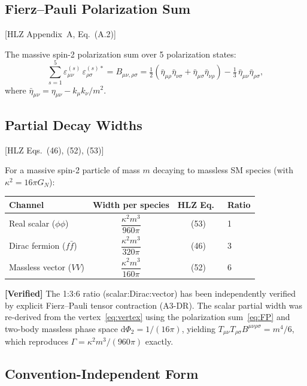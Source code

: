 \documentclass[11pt,a4paper]{article}
\theoremstyle{plain}
\theoremstyle{definition}
\theoremstyle{remark}
\newcommand{\dd}{\mathrm{d}}
\newcommand{\fromlit}[1]{\textcolor{blue!70!black}{\textsf{[#1]}}}
\newcommand{\verified}[1]{%
  \par\smallskip\noindent
  \colorbox{green!10}{\parbox{\dimexpr\linewidth-2\fboxsep}{%
    \textcolor{green!50!black}{\textbf{[Verified]}} #1}}%
  \par\smallskip}
\begin{document}
\subsection{Fierz--Pauli Polarization Sum}

\fromlit{HLZ Appendix~A, Eq.~(A.2)}

The massive spin-2 polarization sum over 5 polarization states:
\begin{equation}\label{eq:FP}
  \sum_{s=1}^{5} \varepsilon_{\mu\nu}^{(s)}\,
  \varepsilon_{\rho\sigma}^{(s)*}
  = B_{\mu\nu,\rho\sigma}
  = \tfrac{1}{2}(\bar{\eta}_{\mu\rho}\bar{\eta}_{\nu\sigma}
    + \bar{\eta}_{\mu\sigma}\bar{\eta}_{\nu\rho})
    - \tfrac{1}{3}\,\bar{\eta}_{\mu\nu}\bar{\eta}_{\rho\sigma},
\end{equation}
where $\bar{\eta}_{\mu\nu} = \eta_{\mu\nu} - k_\mu k_\nu/m^2$.

\subsection{Partial Decay Widths}

\fromlit{HLZ Eqs.~(46), (52), (53)}

For a massive spin-2 particle of mass $m$ decaying to massless SM
species (with $\kappa^2 = 16\pi G_N$):

\begin{center}
\begin{tabular}{lccl}
\toprule
Channel & Width per species & HLZ Eq.\ & Ratio \\
\midrule
Real scalar ($\phi\phi$) &
  $\dfrac{\kappa^2 m^3}{960\pi}$ & (53) & 1 \\[8pt]
Dirac fermion ($f\bar{f}$) &
  $\dfrac{\kappa^2 m^3}{320\pi}$ & (46) & 3 \\[8pt]
Massless vector ($VV$) &
  $\dfrac{\kappa^2 m^3}{160\pi}$ & (52) & 6 \\[4pt]
\bottomrule
\end{tabular}
\end{center}

\verified{The 1:3:6 ratio (scalar:Dirac:vector) has been independently
verified by explicit Fierz--Pauli tensor contraction (A3-DR).  The
scalar partial width was re-derived from the vertex~\eqref{eq:vertex}
using the polarization sum~\eqref{eq:FP} and two-body massless phase
space $\dd\Phi_2 = 1/(16\pi)$, yielding
$T_{\mu\nu}T_{\rho\sigma}B^{\mu\nu\rho\sigma} = m^4/6$, which
reproduces $\Gamma = \kappa^2 m^3/(960\pi)$ exactly.}

\subsection{Convention-Independent Form}
\end{document}
